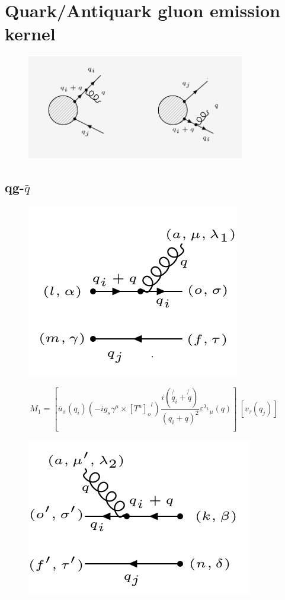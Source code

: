\section{Quark/Antiquark gluon emission kernel}


\begin{figure}[ht!]
\centering
\includegraphics[width=0.85\textwidth]{images/qqg-diagrams.png}
\end{figure}

\subsection{qg-$\bar{q}$}

\begin{figure}[h!]
\centering
\includegraphics[scale=0.7]{images/qgqbarM.png}
\end{figure}

\begin{equation}
M_1 = [{\bar{u}}_{\sigma}(q_i) (-ig_s \gamma^{\mu}\times {[T^a]_o}^l)  \frac{i(\not{q_i} + \not{q})}{(q_i + q)^2} {\varepsilon^{\lambda_1}}_{\mu} (q)]\: [{v}_{\tau}(q_j)]
\end{equation}
\pagebreak
\begin{figure}[h!]
\centering
\includegraphics[scale=0.7]{images/qgqbarMDega.png}
\end{figure}

